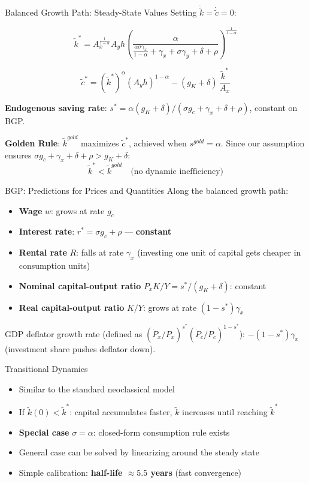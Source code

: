 \documentclass[blue]{beamer}
\begin{document}
\begin{frame}{Balanced Growth Path: Steady-State Values}
	Setting $\dot{\tilde{k}} = \dot{\tilde{c}} = 0$:
	
	\[
	\tilde{k}^* = A_x^{\frac{1}{1-\alpha}}A_y h \left(\frac{\alpha}{\frac{\alpha\sigma\gamma_x}{1-\alpha} + \gamma_x + \sigma\gamma_y + \delta + \rho}\right)^{\!\frac{1}{1-\alpha}} 
	\]
	
	\[
	\tilde{c}^* = (\tilde{k}^*)^\alpha (A_y h)^{1-\alpha} - (g_K + \delta)\,\frac{\tilde{k}^*}{A_x} 
	\]
	
	\textbf{Endogenous saving rate}: $s^* = \alpha(g_K + \delta)/(\sigma g_c + \gamma_x + \delta + \rho)$, constant on BGP.
	
	\textbf{Golden Rule}: $\tilde{k}^{gold}$ maximizes $\tilde{c}^*$, achieved when $s^{gold} = \alpha$. Since our assumption ensures $\sigma g_c + \gamma_x + \delta + \rho > g_K + \delta$:
	\[
	\tilde{k}^* < \tilde{k}^{gold} \quad \text{(no dynamic inefficiency)}
	\]
\end{frame}


\begin{frame}{BGP: Predictions for Prices and Quantities}
	Along the balanced growth path:
	\begin{itemize}
		\item \textbf{Wage} $w$: grows at rate $g_c$
		\item \textbf{Interest rate}: $r^* = \sigma g_c + \rho$ --- \textbf{constant}
		\item \textbf{Rental rate} $R$: falls at rate $\gamma_x$ (investing one unit of capital gets cheaper in consumption units)
		\item \textbf{Nominal capital-output ratio} $P_x K / Y=s^*/(g_K + \delta)$: constant
		\item \textbf{Real capital-output ratio} $K/Y$: grows at rate $(1-s^*)\gamma_x$
	\end{itemize}
	
	\bigskip
	GDP deflator growth rate (defined as $(\dot P_x/P_x)^{s^*}(\dot P_c/P_c)^{1-s^*}$): $-(1-s^*)\gamma_x$ (investment share pushes deflator down).
\end{frame}


\begin{frame}{Transitional Dynamics}
	\begin{itemize}
		\item Similar to the standard neoclassical model
		\item If $\tilde{k}(0) < \tilde{k}^*$: capital accumulates faster, $\tilde{k}$ increases until reaching $\tilde{k}^*$
		\item \textbf{Special case} $\sigma = \alpha$: closed-form consumption rule exists
		\item General case can be solved by linearizing around the steady state 
		\item Simple calibration: \textbf{half-life $\approx 5.5$ years} (fast convergence)
	\end{itemize}
\end{frame}
\end{document}
